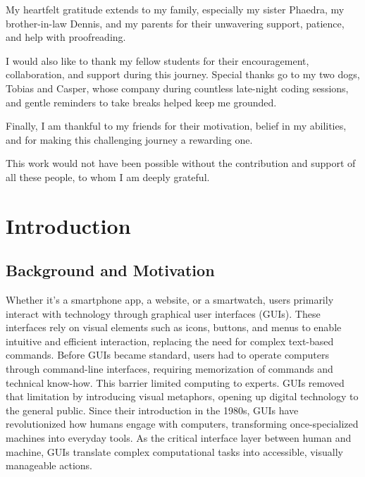 \documentclass[openany]{book}
\begin{document}
My heartfelt gratitude extends to my family, especially my sister Phaedra, my brother-in-law Dennis, and my parents for their unwavering support, patience, and help with proofreading.

I would also like to thank my fellow students for their encouragement, collaboration, and support during this journey. Special thanks go to my two dogs, Tobias and Casper, whose company during countless late-night coding sessions, and gentle reminders to take breaks helped keep me grounded.

Finally, I am thankful to my friends for their motivation, belief in my abilities, and for making this challenging journey a rewarding one.

This work would not have been possible without the contribution and support of all these people, to whom I am deeply grateful.

\tableofcontents
\listoffigures
\listoftables

\chapter{Introduction}
\section{Background and Motivation}
Whether it's a smartphone app, a website, or a smartwatch, users primarily interact with technology through graphical user interfaces (GUIs). These interfaces rely on visual elements such as icons, buttons, and menus to enable intuitive and efficient interaction, replacing the need for complex text-based commands.
Before GUIs became standard, users had to operate computers through command-line interfaces, requiring memorization of commands and technical know-how. This barrier limited computing to experts. GUIs removed that limitation by introducing visual metaphors, opening up digital technology to the general public.
Since their introduction in the 1980s, GUIs have revolutionized how humans engage with computers, transforming once-specialized machines into everyday tools. As the critical interface layer between human and machine, GUIs translate complex computational tasks into accessible, visually manageable actions.
\end{document}
